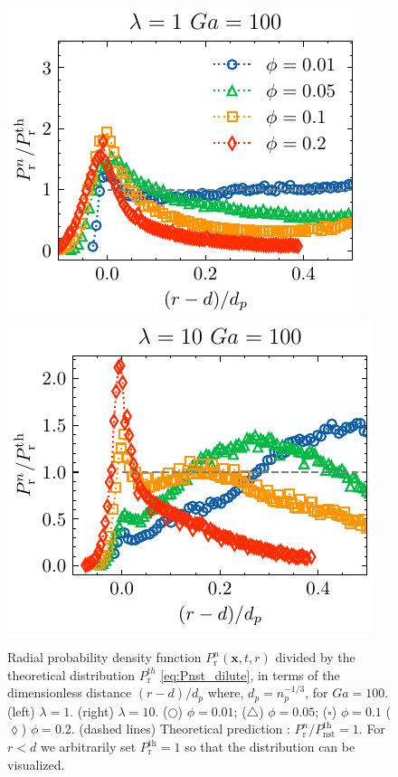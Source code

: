 \begin{figure}[h!]
    \centering
    \includegraphics[height=0.3\textwidth]{image/HOMOGENEOUS_NEW/Dist/Pr_l_1_Ga_100.pdf}
    \includegraphics[height=0.3\textwidth]{image/HOMOGENEOUS_NEW/Dist/Pr_l_10_Ga_100.pdf}
    \caption{Radial probability density function $P_\text{r}^n(\textbf{x},t,r)$ divided by the theoretical distribution $P_\text{r}^{th}$ \ref{eq:Pnst_dilute}, in terms of the dimensionless distance $(r-d)/d_p$ where, $d_p = n_p^{-1/3}$, for  $Ga = 100$.
    (left)  $\lambda = 1$.
    (right) $\lambda = 10$.
    ($\pmb\bigcirc$) $\phi = 0.01$; ($\pmb\triangle$) $ \phi = 0.05$; ($\pmb\square$) $\phi = 0.1$ ($\pmb\lozenge$) $\phi = 0.2$.
    (dashed lines) Theoretical prediction : $P_\text{r}^n/P_\text{nst}^\text{th} = 1$. 
    For $r<d$ we arbitrarily set $P_\text{r}^\text{th} = 1$ so that the distribution can be visualized.
    }
    \label{fig:Pr}
\end{figure}

